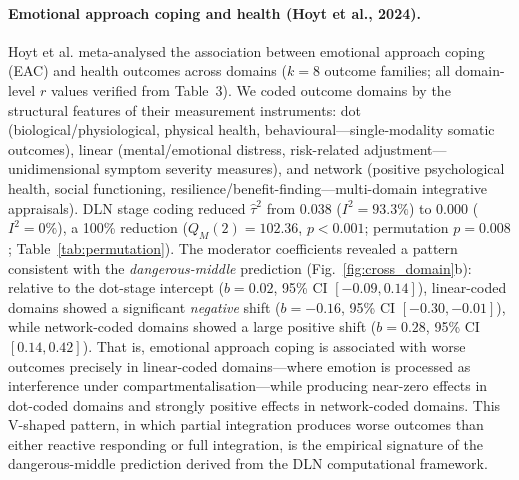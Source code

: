 \documentclass[11pt]{article}
\begin{document}
\paragraph{Emotional approach coping and health (Hoyt et al., 2024).}
Hoyt et al.\cite{Hoyt2024} meta-analysed the association between
emotional approach coping (EAC) and health outcomes across domains ($k = 8$
outcome families; all domain-level $r$ values verified from Table~3).
We coded outcome domains by the structural features of their
measurement instruments: dot (biological/physiological, physical health,
behavioural---single-modality somatic outcomes), linear (mental/emotional
distress, risk-related adjustment---unidimensional symptom severity
measures), and network (positive psychological health,
social functioning, resilience/benefit-finding---multi-domain
integrative appraisals). DLN stage coding reduced $\hat\tau^2$ from 0.038
($I^2 = 93.3\%$) to 0.000 ($I^2 = 0\%$), a 100\% reduction ($Q_M(2) = 102.36$, $p < 0.001$;
permutation $p = 0.008$; Table~\ref{tab:permutation}). The moderator
coefficients revealed a pattern consistent with the
\textit{dangerous-middle} prediction (Fig.~\ref{fig:cross_domain}b):
relative to the dot-stage intercept ($b = 0.02$, 95\% CI $[-0.09,
0.14]$), linear-coded domains showed a significant \textit{negative}
shift ($b = -0.16$, 95\% CI $[-0.30, -0.01]$), while network-coded
domains showed a large positive shift ($b = 0.28$, 95\% CI $[0.14,
0.42]$). That is, emotional approach coping is associated with worse
outcomes precisely in linear-coded domains---where emotion is processed
as interference under compartmentalisation---while producing near-zero
effects in dot-coded domains and strongly positive effects in
network-coded domains. This V-shaped pattern, in which partial
integration produces worse outcomes than either reactive responding or
full integration, is the empirical signature of the dangerous-middle
prediction derived from the DLN computational framework\cite{Wu2026}.
\end{document}
